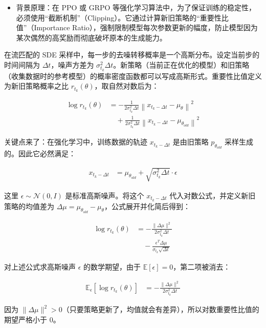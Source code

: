 \begin{itemize}
\tightlist
\item
  背景原理：在 PPO 或 GRPO 等强化学习算法中，为了保证训练的稳定性，必须使用``截断机制''（Clipping）。它通过计算新旧策略的``重要性比值''（Importance Ratio），强制限制模型每次参数更新的幅度，防止模型因为某次偶然的高奖励而彻底破坏原本的生成能力。
\end{itemize}

在流匹配的 SDE 采样中，每一步的去噪转移概率是一个高斯分布。设定当前步的时间间隔为 \(\Delta t\)，噪声方差为 \(\sigma_{t_k}^2\Delta t\)。新策略（当前正在优化的模型）和旧策略（收集数据时的参考模型）的概率密度函数都可以写成高斯形式。重要性比值定义为新旧策略概率之比 \(r_{t_k}(\theta)\)，取自然对数后为：

\[
\begin{aligned}
\log r_{t_k}(\theta)
&=
-\frac{1}{2\sigma_{t_k}^2\Delta t}
\left\|x_{t_k-\Delta t}-\mu_\theta\right\|^2
\\
&\quad+
\frac{1}{2\sigma_{t_k}^2\Delta t}
\left\|x_{t_k-\Delta t}-\mu_{\theta_{old}}\right\|^2
\end{aligned}
\]

关键点来了：在强化学习中，训练数据的轨迹 \(x_{t_k-\Delta t}\) 是由旧策略 \(p_{\theta_{old}}\) 采样生成的。因此它必然满足：

\[
\begin{aligned}
x_{t_k-\Delta t}
&=
\mu_{\theta_{old}}+\sqrt{\sigma_{t_k}^2\Delta t}\cdot\epsilon
\end{aligned}
\]

这里 \(\epsilon\sim\mathcal{N}(0,I)\) 是标准高斯噪声。将这个 \(x_{t_k-\Delta t}\) 代入对数公式，并定义新旧策略的均值差为 \(\Delta\mu=\mu_{\theta_{old}}-\mu_\theta\)，公式展开并化简后得到：

\[
\begin{aligned}
\log r_{t_k}(\theta)
&=
-\frac{\|\Delta\mu\|^2}{2\sigma_{t_k}^2\Delta t}
\\
&\quad-
\frac{\epsilon^T\Delta\mu}{\sigma_{t_k}\sqrt{\Delta t}}
\end{aligned}
\]

对上述公式求高斯噪声 \(\epsilon\) 的数学期望，由于 \(\mathbb{E}[\epsilon]=0\)，第二项被消去：

\[
\begin{aligned}
\mathbb{E}_{\epsilon}\left[\log r_{t_k}(\theta)\right]
&=
-\frac{\|\Delta\mu\|^2}{2\sigma_{t_k}^2\Delta t}
\end{aligned}
\]

因为 \(\|\Delta\mu\|^2>0\)（只要策略更新了，均值就会有差异），所以对数重要性比值的期望严格小于 0。

